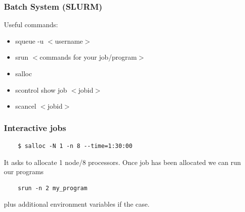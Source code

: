 \begin{frame}
	\frametitle{Batch System (SLURM)}

Useful commands:
	\begin{itemize}
		\item	squeue -u $<$username$>$
		\item   srun $<$commands for your job/program$>$
		\item   salloc
		\item   scontrol show job $<$jobid$>$
                \item   scancel $<$jobid$>$
	\end{itemize}

\end{frame}
\begin{frame}[fragile]
	\frametitle{Interactive jobs}

	\begin{verbatim}
	$ salloc -N 1 -n 8 --time=1:30:00 
	\end{verbatim}

It asks to allocate 1 node/8 processors. Once job has been allocated 
we can run our programs

	\begin{verbatim}
	srun -n 2 my_program
	\end{verbatim}

plus additional environment variables if the case.

\end{frame}

